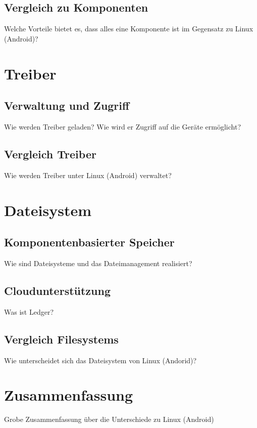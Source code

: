 \documentclass[a4paper]{scrartcl}
\begin{document}
\subsection{Vergleich zu Komponenten}
Welche Vorteile bietet es, dass alles eine Komponente ist im Gegensatz zu Linux (Android)?
\section{Treiber}
\subsection{Verwaltung und Zugriff}
Wie werden Treiber geladen?
Wie wird er Zugriff auf die Geräte ermöglicht?
\subsection{Vergleich Treiber}
Wie werden Treiber unter Linux (Android) verwaltet?
\section{Dateisystem}
\label{sec:Dateisystem}
\subsection{Komponentenbasierter Speicher}
Wie sind Dateisysteme und das Dateimanagement realisiert?
\subsection{Cloudunterstützung}
Was ist Ledger?
\subsection{Vergleich Filesystems}
Wie unterscheidet sich das Dateisystem von Linux (Andorid)?
\section{Zusammenfassung}
Grobe Zusammenfassung über die Unterschiede zu Linux (Android)



\end{document}
